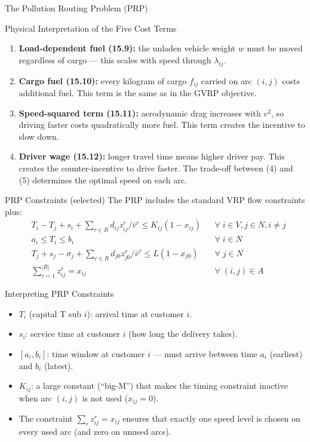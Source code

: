 \documentclass[aspectratio=169,10pt]{beamer}
\begin{document}
\begin{frame}[allowframebreaks]{The Pollution Routing Problem (PRP)}
\begin{alertblock}{Physical Interpretation of the Five Cost Terms}
\begin{enumerate}
      \item \textbf{Load-dependent fuel (15.9):} the unladen vehicle weight $w$
      must be moved regardless of cargo --- this scales with speed through
      $\lambda_{ij}$.

      \item \textbf{Cargo fuel (15.10):} every kilogram of cargo $f_{ij}$
      carried on arc $(i,j)$ costs additional fuel.  This term is the same as
      in the GVRP objective.

      \item \textbf{Speed-squared term (15.11):} aerodynamic drag increases
      with $v^2$, so driving faster costs quadratically more fuel.
      This term creates the incentive to slow down.

      \item \textbf{Driver wage (15.12):} longer travel time means higher
      driver pay.  This creates the counter-incentive to drive faster.
      The trade-off between (4) and (5) determines the optimal speed on each arc.
    \end{enumerate}
  \end{alertblock}

  \framebreak

  \begin{block}{PRP Constraints (selected)}
    The PRP includes the standard VRP flow constraints plus:
    \begin{align}
      &T_i - T_j + s_i + \sum_{r\in R} d_{ij} z_{ij}^r / \bar{v}^r
        \leq K_{ij}(1-x_{ij}) && \forall\; i\in V, j\in N, i\neq j \\[4pt]
      &a_i \leq T_i \leq b_i && \forall\; i\in N \\[4pt]
      &T_j + s_j - \sigma_j + \sum_{r\in R} d_{j0} z_{j0}^r / \bar{v}^r
        \leq L(1-x_{j0}) && \forall\; j\in N \\[4pt]
      &\sum_{r=1}^{|R|} z_{ij}^r = x_{ij} && \forall\; (i,j)\in A
    \end{align}
  \end{block}

  \begin{block}{Interpreting PRP Constraints}
    \begin{itemize}
      \item $T_i$ (capital T sub $i$): arrival time at customer $i$.
      \item $s_i$: service time at customer $i$ (how long the delivery takes).
      \item $[a_i, b_i]$: time window at customer $i$ --- must arrive between
      time $a_i$ (earliest) and $b_i$ (latest).
      \item $K_{ij}$: a large constant (``big-M'') that makes the timing
      constraint inactive when arc $(i,j)$ is not used ($x_{ij}=0$).
      \item The constraint $\sum_r z_{ij}^r = x_{ij}$ ensures that exactly
      one speed level is chosen on every used arc (and zero on unused arcs).
    \end{itemize}
  \end{block}


\end{frame}
\end{document}
